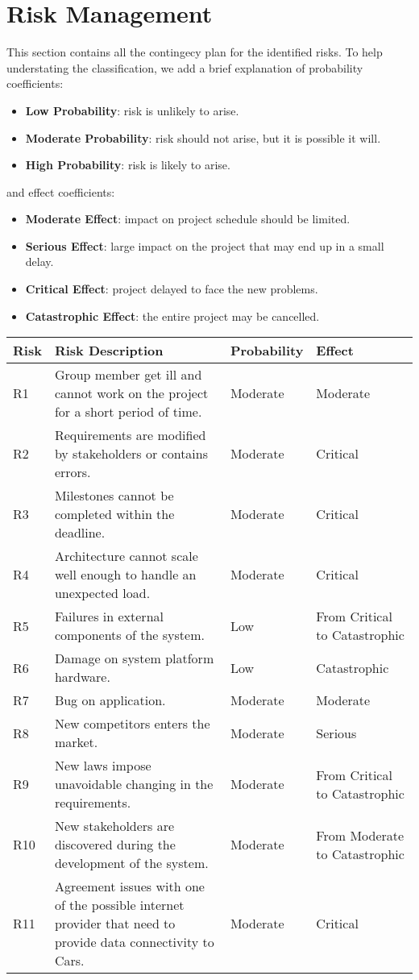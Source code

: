 \section{Risk Management}
This section contains all the contingecy plan for the identified risks. To help understating the classification, we add a brief explanation of probability coefficients:
\begin{itemize}
    \item \textbf{Low Probability}: risk is unlikely to arise.
    \item \textbf{Moderate Probability}: risk should not arise, but it is possible it will.
    \item \textbf{High Probability}: risk is likely to arise.
\end{itemize}
and effect coefficients:
\begin{itemize}
    \item \textbf{Moderate Effect}: impact on project schedule should be limited.
    \item \textbf{Serious Effect}: large impact on the project that may end up in a small delay.
    \item \textbf{Critical Effect}: project delayed to face the new problems.
    \item \textbf{Catastrophic Effect}: the entire project may be cancelled.
\end{itemize}


\begin{tabular}{| l | p{7cm}  | l |  p{2.8cm} |}
\hline
\textbf{Risk} & \textbf{Risk Description} & \textbf{Probability} & \textbf{Effect}\\
\hline
R1 & Group member get ill and cannot work on the project for a short period of time. & Moderate & Moderate\\
\hline
R2 & Requirements are modified by stakeholders or contains errors. & Moderate & Critical\\
\hline
R3 & Milestones cannot be completed within the deadline. & Moderate & Critical\\
\hline
R4 & Architecture cannot scale well enough to handle an unexpected load. & Moderate & Critical\\
\hline
R5 & Failures in external components of the system. & Low & From Critical to Catastrophic\\
\hline
R6 & Damage on system platform hardware. & Low & Catastrophic\\
\hline
R7 & Bug on application. & Moderate & Moderate\\
\hline
R8 & New competitors enters the market. & Moderate & Serious\\
\hline
R9 & New laws impose unavoidable changing in the requirements. & Moderate & From Critical to Catastrophic\\
\hline
R10 & New stakeholders are discovered during the development of the system. & Moderate & From Moderate to Catastrophic\\
\hline
R11 & Agreement issues with one of the possible internet provider that need to provide data connectivity to Cars. & Moderate & Critical\\
\hline
\end{tabular}

